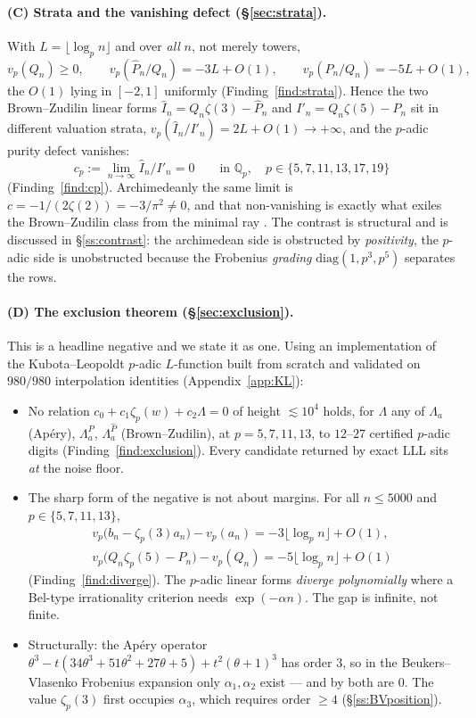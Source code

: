 \documentclass[11pt,reqno]{article}
\newcommand{\Qp}{\mathbb{Q}_p}
\newcommand{\Ph}{\widehat{P}}
\newcommand{\Ih}{\widehat{I}}
\newcommand{\Ip}{I'}
\newcommand{\Lah}{\Lambda^{\Ph}}
\newcommand{\Lap}{\Lambda^{P}}
\newcommand{\vp}{v_p}
\newcommand{\floor}[1]{\lfloor #1 \rfloor}
\theoremstyle{plain}
\theoremstyle{definition}
\theoremstyle{remark}
\numberwithin{equation}{section}
\begin{document}
\paragraph{(C) Strata and the vanishing defect (\S\ref{sec:strata}).}
With $L=\floor{\log_p n}$ and over \emph{all} $n$, not merely towers,
\[
  \vp(Q_n)\ge0,\qquad
  \vp(\Ph_n/Q_n)=-3L+O(1),\qquad
  \vp(P_n/Q_n)=-5L+O(1),
\]
the $O(1)$ lying in $[-2,1]$ uniformly (Finding~\ref{find:strata}).  Hence the
two Brown--Zudilin linear forms $\Ih_n=Q_n\zeta(3)-\Ph_n$ and
$\Ip_n=Q_n\zeta(5)-P_n$ sit in different valuation strata,
$\vp(\Ih_n/\Ip_n)=2L+O(1)\to+\infty$, and the $p$-adic purity defect vanishes:
\[
  c_p:=\lim_{n\to\infty}\Ih_n/\Ip_n=0
  \qquad\text{in }\Qp,\quad p\in\{5,7,11,13,17,19\}
\]
(Finding~\ref{find:cp}).  Archimedeanly the same limit is
$c=-1/(2\zeta(2))=-3/\pi^2\ne0$, and that non-vanishing is exactly what exiles
the Brown--Zudilin class from the minimal ray \cite{PaperB-inprep}.  The
contrast is structural and is discussed in \S\ref{ss:contrast}: the archimedean
side is obstructed by \emph{positivity}, the $p$-adic side is unobstructed
because the Frobenius \emph{grading} $\mathrm{diag}(1,p^3,p^5)$ separates the
rows.

\paragraph{(D) The exclusion theorem (\S\ref{sec:exclusion}).}
This is a headline negative and we state it as one.  Using an
implementation of the Kubota--Leopoldt $p$-adic $L$-function built from scratch
and validated on $980/980$ interpolation identities (Appendix~\ref{app:KL}):
\begin{itemize}[leftmargin=1.5em]
\item No relation $c_0+c_1\zeta_p(w)+c_2\Lambda=0$ of height $\lesssim10^4$
  holds, for $\Lambda$ any of $\Lambda_a$ (Ap\'ery), $\Lap_a$, $\Lah_a$
  (Brown--Zudilin), at $p=5,7,11,13$, to $12$--$27$ certified $p$-adic digits
  (Finding~\ref{find:exclusion}).  Every candidate returned by exact LLL sits
  \emph{at} the noise floor.
\item The sharp form of the negative is not about margins.  For all $n\le5000$
  and $p\in\{5,7,11,13\}$,
  \begin{gather*}
    \vp\bigl(b_n-\zeta_p(3)a_n\bigr)-\vp(a_n)=-3\floor{\log_pn}+O(1),\\
    \vp\bigl(Q_n\zeta_p(5)-P_n\bigr)-\vp(Q_n)=-5\floor{\log_pn}+O(1)
  \end{gather*}
  (Finding~\ref{find:diverge}).  The $p$-adic linear forms \emph{diverge
  polynomially} where a Bel-type irrationality criterion
  \cite[Lemma~4]{LSZ2025} needs $\exp(-\alpha n)$.  The gap is infinite, not
  finite.
\item Structurally: the Ap\'ery operator
  $\theta^3-t(34\theta^3+51\theta^2+27\theta+5)+t^2(\theta+1)^3$ has order $3$,
  so in the Beukers--Vlasenko Frobenius expansion only $\alpha_1,\alpha_2$
  exist --- and by \cite[Thm.~1.5]{BV2025} both are $0$.  The value
  $\zeta_p(3)$ first occupies $\alpha_3$, which requires order $\ge4$
  (\S\ref{ss:BVposition}).
\end{itemize}
\end{document}
